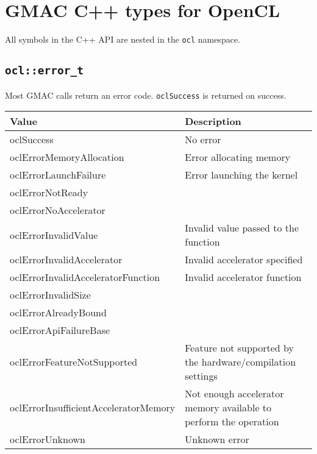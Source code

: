 \section{GMAC C++ types for OpenCL}

All symbols in the C++ API are nested in the \texttt{ocl} namespace.

\subsection{\texttt{ocl::error\_t}}

Most GMAC calls return an error code. \texttt{oclSuccess} is returned on success.

\begin{tabular}{|l|l|}
  \hline
  Value & Description \\
  \hline
  \hline
  oclSuccess                            & No error                             \\
  oclErrorMemoryAllocation              & Error allocating memory              \\
  oclErrorLaunchFailure                 & Error launching the kernel           \\
  oclErrorNotReady                      &                                      \\
  oclErrorNoAccelerator                 &                                      \\
  oclErrorInvalidValue                  & Invalid value passed to the function \\
  oclErrorInvalidAccelerator            & Invalid accelerator specified        \\
  oclErrorInvalidAcceleratorFunction    & Invalid accelerator function         \\
  oclErrorInvalidSize                   &                                      \\
  oclErrorAlreadyBound                  &                                      \\
  oclErrorApiFailureBase                &                                      \\
  oclErrorFeatureNotSupported           & Feature not supported by the hardware\slash{}compilation
                                          settings                             \\
  oclErrorInsufficientAcceleratorMemory & Not enough accelerator memory available to perform the 
                                          operation                            \\
  oclErrorUnknown                       & Unknown error                        \\
  \hline
\end{tabular}

